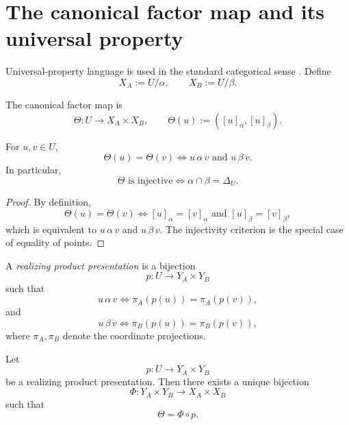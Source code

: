 \section{The canonical factor map and its universal property}
\label{sec:Theta}
Universal-property language is used in the standard categorical sense
\cite{MacLane1998}.
Define
\[
	X_A:=U/\alpha,
	\qquad
	X_B:=U/\beta.
\]
\begin{definition}
	\label{def:Theta}
	The canonical factor map is
	\[
		\Theta:U\to X_A\times X_B,
		\qquad
		\Theta(u):=([u]_\alpha,[u]_\beta).
	\]
\end{definition}
\begin{lemma}
	\label{lem:kernel}
	For \(u,v\in U\),
	\[
		\Theta(u)=\Theta(v)
		\iff
		u\,\alpha\,v
		\text{ and }
		u\,\beta\,v.
	\]
	In particular,
	\[
		\Theta\text{ is injective}
		\iff
		\alpha\cap\beta=\Delta_U.
	\]
\end{lemma}
\begin{proof}
	By definition,
	\[
		\Theta(u)=\Theta(v)
		\iff
		[u]_\alpha=[v]_\alpha
		\text{ and }
		[u]_\beta=[v]_\beta,
	\]
	which is equivalent to \(u\,\alpha\,v\) and \(u\,\beta\,v\).
	The injectivity criterion is the special case of equality of points.
\end{proof}
\begin{definition}
	A \emph{realizing product presentation} is a bijection
	\[
		p:U\to Y_A\times Y_B
	\]
	such that
	\[
		u\,\alpha\,v
		\iff
		\pi_A(p(u))=\pi_A(p(v)),
	\]
	and
	\[
		u\,\beta\,v
		\iff
		\pi_B(p(u))=\pi_B(p(v)),
	\]
	where \(\pi_A,\pi_B\) denote the coordinate projections.
\end{definition}
\begin{proposition}
	\label{prop:terminality}
	Let
	\[
		p:U\to Y_A\times Y_B
	\]
	be a realizing product presentation. Then there exists a unique
	bijection
	\[
		\Phi:Y_A\times Y_B\to X_A\times X_B
	\]
	such that
	\[
		\Theta=\Phi\circ p.
	\]
\end{proposition}
